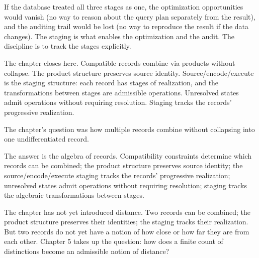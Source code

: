 If the database treated all three stages as one, the
optimization opportunities would vanish (no way to reason about
the query plan separately from the result), and the auditing
trail would be lost (no way to reproduce the result if the data
changes). The staging is what enables the optimization and the
audit. The discipline is to track the stages explicitly.

The chapter closes here. Compatible records combine via products
without collapse. The product structure preserves source
identity. Source/encode/execute is the staging structure: each
record has stages of realization, and the transformations
between stages are admissible operations. Unresolved states
admit operations without requiring resolution. Staging tracks
the records' progressive realization.

\begin{bridge}

The chapter's question was how multiple records combine without
collapsing into one undifferentiated record.

The answer is the algebra of records. Compatibility constraints
determine which records can be combined; the product structure
preserves source identity; the source/encode/execute staging
tracks the records' progressive realization; unresolved states
admit operations without requiring resolution; staging tracks
the algebraic transformations between stages.

The chapter has not yet introduced distance. Two records can be
combined; the product structure preserves their identities; the
staging tracks their realization. But two records do not yet have
a notion of how close or how far they are from each other.
Chapter 5 takes up the question: how does a finite count of
distinctions become an admissible notion of distance?

\end{bridge}

